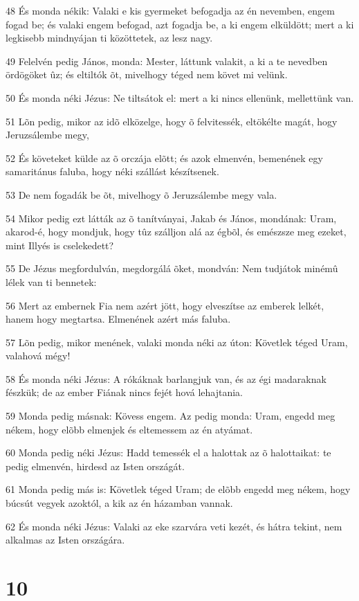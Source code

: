 \par 48 És monda nékik: Valaki e kis gyermeket befogadja az én nevemben, engem fogad be; és valaki engem befogad, azt fogadja be, a ki engem elküldött; mert a ki legkisebb mindnyájan ti közöttetek, az lesz nagy.
\par 49 Felelvén pedig János, monda: Mester, láttunk valakit, a ki a te nevedben ördögöket ûz; és eltiltók õt, mivelhogy téged nem követ mi velünk.
\par 50 És monda néki Jézus: Ne tiltsátok el: mert a ki nincs ellenünk, mellettünk van.
\par 51 Lõn pedig, mikor az idõ elközelge, hogy õ felvitessék, eltökélte magát, hogy Jeruzsálembe megy,
\par 52 És követeket külde az õ orczája elõtt; és azok elmenvén, bemenének egy samaritánus faluba, hogy néki szállást készítsenek.
\par 53 De nem fogadák be õt, mivelhogy õ Jeruzsálembe megy vala.
\par 54 Mikor pedig ezt látták az õ tanítványai, Jakab és János, mondának: Uram, akarod-é, hogy mondjuk, hogy tûz szálljon alá az égbõl, és emészsze meg ezeket, mint Illyés is cselekedett?
\par 55 De Jézus megfordulván, megdorgálá õket, mondván: Nem tudjátok minémû lélek van ti bennetek:
\par 56 Mert az embernek Fia nem azért jött, hogy elveszítse az emberek lelkét, hanem hogy megtartsa. Elmenének azért más faluba.
\par 57 Lõn pedig, mikor menének, valaki monda néki az úton: Követlek téged Uram, valahová mégy!
\par 58 És monda néki Jézus: A rókáknak barlangjuk van, és az égi madaraknak fészkük; de az ember Fiának nincs fejét hová lehajtania.
\par 59 Monda pedig másnak: Kövess engem. Az pedig monda: Uram, engedd meg nékem, hogy elõbb elmenjek és eltemessem az én atyámat.
\par 60 Monda pedig néki Jézus: Hadd temessék el a halottak az õ halottaikat: te pedig elmenvén, hirdesd az Isten országát.
\par 61 Monda pedig más is: Követlek téged Uram; de elõbb engedd meg nékem, hogy búcsút vegyek azoktól, a kik az én házamban vannak.
\par 62 És monda néki Jézus: Valaki az eke szarvára veti kezét, és hátra tekint, nem alkalmas az Isten országára.

\chapter{10}

